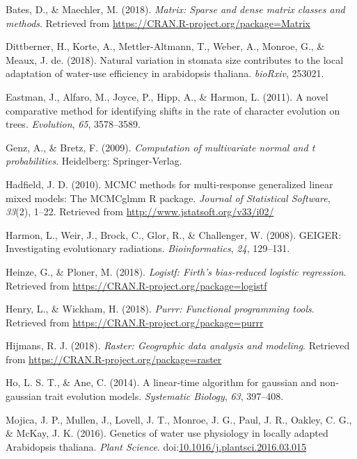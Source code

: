 \documentclass[man,floatsintext]{apa6}
\theoremstyle{definition}
\theoremstyle{definition}
\theoremstyle{definition}
\theoremstyle{remark}
\begin{document}
\leavevmode\hypertarget{ref-R-Matrix}{}%
Bates, D., \& Maechler, M. (2018). \emph{Matrix: Sparse and dense matrix
classes and methods}. Retrieved from
\url{https://CRAN.R-project.org/package=Matrix}

\leavevmode\hypertarget{ref-dittberner2018natural}{}%
Dittberner, H., Korte, A., Mettler-Altmann, T., Weber, A., Monroe, G.,
\& Meaux, J. de. (2018). Natural variation in stomata size contributes
to the local adaptation of water-use efficiency in arabidopsis thaliana.
\emph{bioRxiv}, 253021.

\leavevmode\hypertarget{ref-R-geiger_b}{}%
Eastman, J., Alfaro, M., Joyce, P., Hipp, A., \& Harmon, L. (2011). A
novel comparative method for identifying shifts in the rate of character
evolution on trees. \emph{Evolution}, \emph{65}, 3578--3589.

\leavevmode\hypertarget{ref-R-mvtnorm}{}%
Genz, A., \& Bretz, F. (2009). \emph{Computation of multivariate normal
and t probabilities}. Heidelberg: Springer-Verlag.

\leavevmode\hypertarget{ref-R-MCMCglmm}{}%
Hadfield, J. D. (2010). MCMC methods for multi-response generalized
linear mixed models: The MCMCglmm R package. \emph{Journal of
Statistical Software}, \emph{33}(2), 1--22. Retrieved from
\url{http://www.jstatsoft.org/v33/i02/}

\leavevmode\hypertarget{ref-R-geiger_d}{}%
Harmon, L., Weir, J., Brock, C., Glor, R., \& Challenger, W. (2008).
GEIGER: Investigating evolutionary radiations. \emph{Bioinformatics},
\emph{24}, 129--131.

\leavevmode\hypertarget{ref-R-logistf}{}%
Heinze, G., \& Ploner, M. (2018). \emph{Logistf: Firth's bias-reduced
logistic regression}. Retrieved from
\url{https://CRAN.R-project.org/package=logistf}

\leavevmode\hypertarget{ref-R-purrr}{}%
Henry, L., \& Wickham, H. (2018). \emph{Purrr: Functional programming
tools}. Retrieved from \url{https://CRAN.R-project.org/package=purrr}

\leavevmode\hypertarget{ref-R-raster}{}%
Hijmans, R. J. (2018). \emph{Raster: Geographic data analysis and
modeling}. Retrieved from
\url{https://CRAN.R-project.org/package=raster}

\leavevmode\hypertarget{ref-R-phylolm}{}%
Ho, L. S. T., \& Ane, C. (2014). A linear-time algorithm for gaussian
and non-gaussian trait evolution models. \emph{Systematic Biology},
\emph{63}, 397--408.

\leavevmode\hypertarget{ref-Mojica2016}{}%
Mojica, J. P., Mullen, J., Lovell, J. T., Monroe, J. G., Paul, J. R.,
Oakley, C. G., \& McKay, J. K. (2016). Genetics of water use physiology
in locally adapted Arabidopsis thaliana. \emph{Plant Science}.
doi:\href{https://doi.org/10.1016/j.plantsci.2016.03.015}{10.1016/j.plantsci.2016.03.015}
\end{document}
